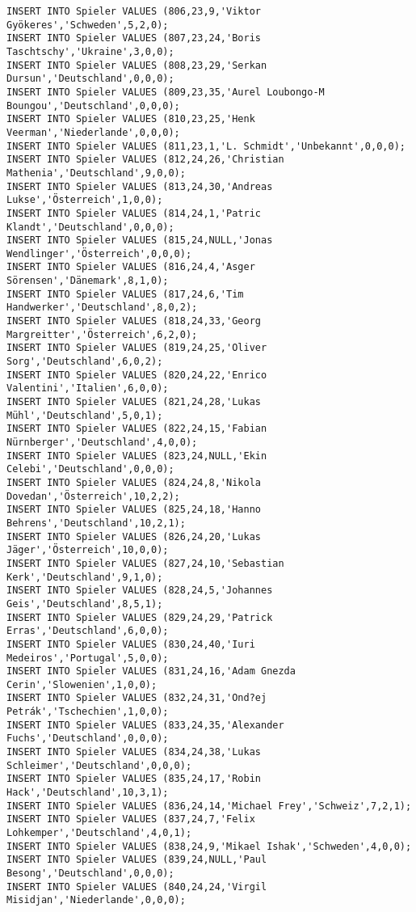 \documentclass{lehramt-informatik-aufgabe}
\begin{document}
\begin{verbatim}
INSERT INTO Spieler VALUES (806,23,9,'Viktor Gyökeres','Schweden',5,2,0);
INSERT INTO Spieler VALUES (807,23,24,'Boris Taschtschy','Ukraine',3,0,0);
INSERT INTO Spieler VALUES (808,23,29,'Serkan Dursun','Deutschland',0,0,0);
INSERT INTO Spieler VALUES (809,23,35,'Aurel Loubongo-M Boungou','Deutschland',0,0,0);
INSERT INTO Spieler VALUES (810,23,25,'Henk Veerman','Niederlande',0,0,0);
INSERT INTO Spieler VALUES (811,23,1,'L. Schmidt','Unbekannt',0,0,0);
INSERT INTO Spieler VALUES (812,24,26,'Christian Mathenia','Deutschland',9,0,0);
INSERT INTO Spieler VALUES (813,24,30,'Andreas Lukse','Österreich',1,0,0);
INSERT INTO Spieler VALUES (814,24,1,'Patric Klandt','Deutschland',0,0,0);
INSERT INTO Spieler VALUES (815,24,NULL,'Jonas Wendlinger','Österreich',0,0,0);
INSERT INTO Spieler VALUES (816,24,4,'Asger Sörensen','Dänemark',8,1,0);
INSERT INTO Spieler VALUES (817,24,6,'Tim Handwerker','Deutschland',8,0,2);
INSERT INTO Spieler VALUES (818,24,33,'Georg Margreitter','Österreich',6,2,0);
INSERT INTO Spieler VALUES (819,24,25,'Oliver Sorg','Deutschland',6,0,2);
INSERT INTO Spieler VALUES (820,24,22,'Enrico Valentini','Italien',6,0,0);
INSERT INTO Spieler VALUES (821,24,28,'Lukas Mühl','Deutschland',5,0,1);
INSERT INTO Spieler VALUES (822,24,15,'Fabian Nürnberger','Deutschland',4,0,0);
INSERT INTO Spieler VALUES (823,24,NULL,'Ekin Celebi','Deutschland',0,0,0);
INSERT INTO Spieler VALUES (824,24,8,'Nikola Dovedan','Österreich',10,2,2);
INSERT INTO Spieler VALUES (825,24,18,'Hanno Behrens','Deutschland',10,2,1);
INSERT INTO Spieler VALUES (826,24,20,'Lukas Jäger','Österreich',10,0,0);
INSERT INTO Spieler VALUES (827,24,10,'Sebastian Kerk','Deutschland',9,1,0);
INSERT INTO Spieler VALUES (828,24,5,'Johannes Geis','Deutschland',8,5,1);
INSERT INTO Spieler VALUES (829,24,29,'Patrick Erras','Deutschland',6,0,0);
INSERT INTO Spieler VALUES (830,24,40,'Iuri Medeiros','Portugal',5,0,0);
INSERT INTO Spieler VALUES (831,24,16,'Adam Gnezda Cerin','Slowenien',1,0,0);
INSERT INTO Spieler VALUES (832,24,31,'Ond?ej Petrák','Tschechien',1,0,0);
INSERT INTO Spieler VALUES (833,24,35,'Alexander Fuchs','Deutschland',0,0,0);
INSERT INTO Spieler VALUES (834,24,38,'Lukas Schleimer','Deutschland',0,0,0);
INSERT INTO Spieler VALUES (835,24,17,'Robin Hack','Deutschland',10,3,1);
INSERT INTO Spieler VALUES (836,24,14,'Michael Frey','Schweiz',7,2,1);
INSERT INTO Spieler VALUES (837,24,7,'Felix Lohkemper','Deutschland',4,0,1);
INSERT INTO Spieler VALUES (838,24,9,'Mikael Ishak','Schweden',4,0,0);
INSERT INTO Spieler VALUES (839,24,NULL,'Paul Besong','Deutschland',0,0,0);
INSERT INTO Spieler VALUES (840,24,24,'Virgil Misidjan','Niederlande',0,0,0);

\end{verbatim}
\end{document}
